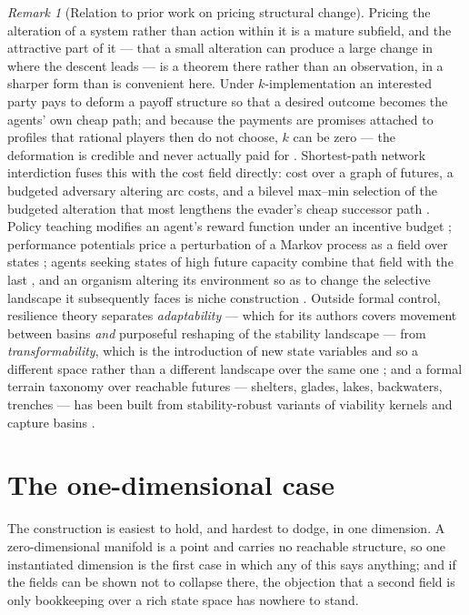\documentclass[11pt,a4paper]{article}
\theoremstyle{remark}
\newtheorem{remark}[definition]{Remark}
\begin{document}
\begin{remark}[Relation to prior work on pricing structural change]\label{rem:deform-prior}
Pricing the alteration of a system rather than action within it is a mature subfield, and the
attractive part of it --- that a small alteration can produce a large change in where the descent
leads --- is a theorem there rather than an observation, in a sharper form than is convenient here.
Under $k$-implementation an interested party pays to deform a payoff structure so that a desired
outcome becomes the agents' own cheap path; and because the payments are promises attached to
profiles that rational players then do not choose, $k$ can be zero --- the deformation is credible
and never actually paid for \citep{monderer2004}. Shortest-path network interdiction fuses this with
the cost field directly: cost over a graph of futures, a budgeted adversary altering arc costs, and a
bilevel max--min selection of the budgeted alteration that most lengthens the evader's cheap successor path
\citep{israeli2002}. Policy teaching modifies an agent's reward function under an incentive budget
\citep{zhang2009}; performance potentials price a perturbation of a Markov process as a field over
states \citep{cao1997,cao1998}; agents seeking states of high future capacity combine that field with
the last \citep{salge2014}, and an organism altering its environment so as to change the selective
landscape it subsequently faces is niche construction \citep{odlingsmee2003}. Outside formal control,
resilience theory separates \emph{adaptability} --- which for its authors covers movement between
basins \emph{and} purposeful reshaping of the stability landscape --- from \emph{transformability},
which is the introduction of new state variables and so a different space rather than a different
landscape over the same one \citep{walker2004}; and a formal terrain taxonomy over reachable
futures --- shelters, glades, lakes, backwaters, trenches --- has been built from stability-robust
variants of viability kernels and capture basins \citep{heitzig2016}.
\end{remark}

\section{The one-dimensional case}\label{sec:onedim}

The construction is easiest to hold, and hardest to dodge, in one dimension. A zero-dimensional
manifold is a point and carries no reachable structure, so one instantiated dimension is the first
case in which any of this says anything; and if the fields can be shown not to collapse there, the
objection that a second field is only bookkeeping over a rich state space has nowhere to stand.
\end{document}
